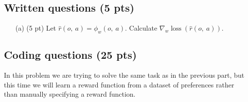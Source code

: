 \documentclass{article}
\begin{document}
\subsection{Written questions (5 pts)}

\begin{enumerate}

\item[(a) (5 pt)] Let $\hat{r}(o,\ a) = \phi_w(o,\ a)$. Calculate $\nabla_w \operatorname{loss}(\hat{r}(o,\ a))$.
\end{enumerate}

\subsection{Coding questions (25 pts)}

In this problem we are trying to solve the same task as in the previous part, but this time we will learn a reward function from a dataset of preferences rather than manually specifying a reward function. 
\end{document}
